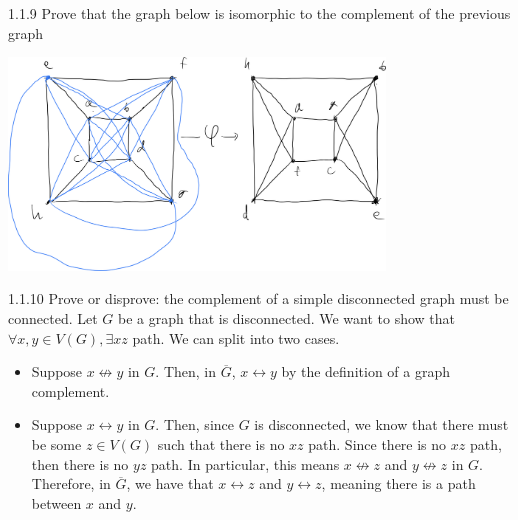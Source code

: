 \documentclass[9pt]{extarticle}
\begin{document}
\begin{problem}{1.1.9}
      Prove that the graph below is isomorphic to the complement of the previous graph
  \begin{center}
  \end{center} 
  \tcblower
  \begin{center}
    \includegraphics[width=10cm]{1_1_9}
  \end{center}
\end{problem}
\begin{problem}{1.1.10}
   Prove or disprove: the complement of a simple disconnected graph must be connected.
   \tcblower
   Let $G$ be a graph that is disconnected. We want to show that $\forall x,y\in V(G), \exists xz$ path. We can split into two cases.
     \begin{itemize}
       \item Suppose $x\not\leftrightarrow y$ in $G$. Then, in $\overline{G}$, $x\leftrightarrow y$ by the definition of a graph complement.
       \item Suppose $x\leftrightarrow y$ in $G$. Then, since $G$ is disconnected, we know that there must be some $z\in V(G)$ such that there is no $xz$ path. Since there is no $xz$ path, then there is no $yz$ path. In particular, this means $x\not\leftrightarrow z$ and $y\not\leftrightarrow z$ in $G$. Therefore, in $\overline{G}$, we have that $x\leftrightarrow z$ and $y\leftrightarrow z$, meaning there is a path between $x$ and $y$.
     \end{itemize}
\end{problem}
\end{document}
